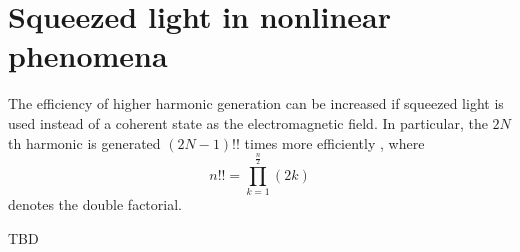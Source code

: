 \section{Squeezed light in nonlinear phenomena}
The efficiency of higher harmonic generation can be increased if squeezed light is used instead of a coherent state as the electromagnetic field. In particular, the $2N$th harmonic is generated $(2N-1)!!$ times more efficiently \cite[pp. 72-76]{bBykov}, where
\[
n!! = \prod_{k=1}^{\frac{n}{2}}(2k)
\]
denotes the double factorial.

TBD

